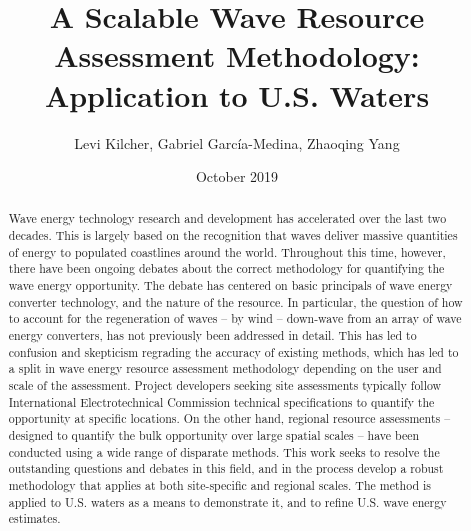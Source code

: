 \documentclass[authoryear,preprint]{elsarticle}
\title{A Scalable Wave Resource Assessment Methodology: Application to U.S. Waters}
\author{Levi Kilcher, Gabriel Garc\'ia-Medina, Zhaoqing Yang}
\date{October 2019}
\begin{document}
\begin{abstract}
Wave energy technology research and development has accelerated over the last two decades. This is largely based on the recognition that waves deliver massive quantities of energy to populated coastlines around the world. Throughout this time, however, there have been ongoing debates about the correct methodology for quantifying the wave energy opportunity. The debate has centered on basic principals of wave energy converter technology, and the nature of the resource. In particular, the question of how to account for the regeneration of waves -- by wind -- down-wave from an array of wave energy converters, has not previously been addressed in detail. This has led to confusion and skepticism regrading the accuracy of existing methods, which has led to a split in wave energy resource assessment methodology depending on the user and scale of the assessment. Project developers seeking site assessments typically follow International Electrotechnical Commission technical specifications to quantify the opportunity at specific locations. On the other hand, regional resource assessments -- designed to quantify the bulk opportunity over large spatial scales -- have been conducted using a wide range of disparate methods. This work seeks to resolve the outstanding questions and debates in this field, and in the process develop a robust methodology that applies at both site-specific and regional scales. The method is applied to U.S. waters as a means to demonstrate it, and to refine U.S. wave energy estimates.
\end{abstract}

\maketitle


%





%
%

\clearpage



\end{document}
